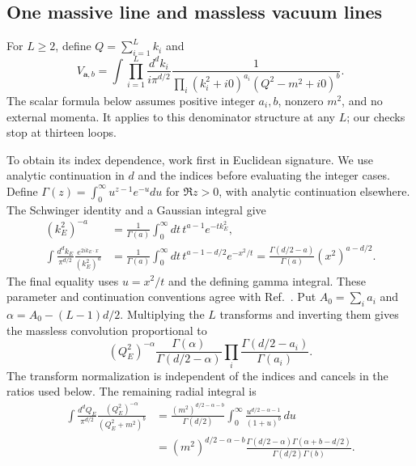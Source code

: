 \subsection{One massive line and massless vacuum lines}
For $L\geq2$, define $Q=\sum_{i=1}^Lk_i$ and
\begin{equation}
 V_{\boldsymbol a,b}=\int\prod_{i=1}^L\frac{d^dk_i}{i\pi^{d/2}}
 \frac{1}{\prod_i(k_i^2+i0)^{a_i}(Q^2-m^2+i0)^b}.
 \label{eq:vacuum13-definition}
\end{equation}
The scalar formula below assumes positive integer $a_i,b$, nonzero $m^2$, and no external momenta. It applies to this denominator structure at any $L$; our checks stop at thirteen loops.

To obtain its index dependence, work first in Euclidean signature. We use analytic continuation in $d$ and the indices before evaluating the integer cases. Define $\Gamma(z)=\int_0^\infty u^{z-1}e^{-u}du$ for $\Re z>0$, with analytic continuation elsewhere. The Schwinger identity and a Gaussian integral give
\begin{align}
 (k_E^2)^{-a}&=\frac{1}{\Gamma(a)}\int_0^\infty dt\,t^{a-1}e^{-tk_E^2},\nonumber\\
 \int\frac{d^dk_E}{\pi^{d/2}}\frac{e^{2ik_E\cdot x}}{(k_E^2)^a}
 &=\frac{1}{\Gamma(a)}\int_0^\infty dt\,t^{a-1-d/2}e^{-x^2/t}
 =\frac{\Gamma(d/2-a)}{\Gamma(a)}(x^2)^{a-d/2}.
 \label{eq:vacuum13-fourier}
\end{align}
The final equality uses $u=x^2/t$ and the defining gamma integral. These parameter and continuation conventions agree with Ref.~\cite{Weinzierl2022}. Put $A_0=\sum_i a_i$ and $\alpha=A_0-(L-1)d/2$. Multiplying the $L$ transforms and inverting them gives the massless convolution proportional to
\begin{equation}
 (Q_E^2)^{-\alpha}\frac{\Gamma(\alpha)}{\Gamma(d/2-\alpha)}
 \prod_i\frac{\Gamma(d/2-a_i)}{\Gamma(a_i)}.
 \label{eq:vacuum13-convolution}
\end{equation}
The transform normalization is independent of the indices and cancels in the ratios used below. The remaining radial integral is
\begin{align}
 \int\frac{d^dQ_E}{\pi^{d/2}}\frac{(Q_E^2)^{-\alpha}}{(Q_E^2+m^2)^b}
 &=\frac{(m^2)^{d/2-\alpha-b}}{\Gamma(d/2)}
 \int_0^\infty\frac{u^{d/2-\alpha-1}}{(1+u)^b}\,du\nonumber\\
 &= (m^2)^{d/2-\alpha-b}
 \frac{\Gamma(d/2-\alpha)\Gamma(\alpha+b-d/2)}{\Gamma(d/2)\Gamma(b)}.
 \label{eq:vacuum13-radial}
\end{align}
